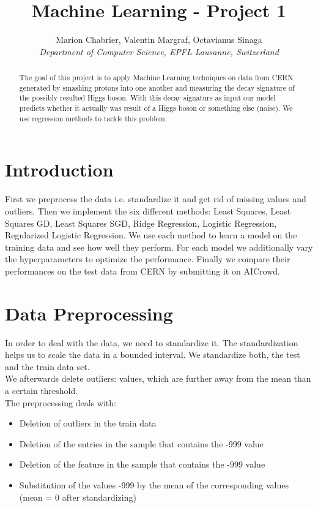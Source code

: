 \documentclass[10pt,conference,compsocconf]{IEEEtran}
\begin{document}
\title{Machine Learning - Project 1}

\author{
  Marion Chabrier, Valentin Margraf, Octavianus Sinaga\\
  \textit{Department of Computer Science, EPFL Lausanne, Switzerland}
}

\maketitle

\begin{abstract}
The goal of this project is to apply Machine Learning techniques on data from CERN generated by smashing protons into one another and measuring the decay signature of the possibly resulted Higgs boson. With this decay signature as input our model predicts whether it actually was result of a Higgs boson or something else (noise). We use regression methods to tackle this problem.
\end{abstract}

\section{Introduction}
First we preprocess the data i.e. standardize it and get rid of missing values and outliers.
Then we implement the six different methods: Least Squares, Least Squares GD, Least Squares SGD, Ridge Regression, Logistic Regression, Regularized Logistic Regression. We use each method to learn a model on the training data and see how well they perform. For each model we additionally vary the hyperparameters to optimize the performance. Finally we compare their performances on the test data from CERN by submitting it on AICrowd.



\section{Data Preprocessing}
\label{sec:prepro}
In order to deal with the data, we need to standardize it. The standardization helps us to scale the data in a bounded interval. We standardize both, the test and the train data set. \\
We afterwards delete outliers: values, which are further away from the mean than a certain threshold. 
\\
The preprocessing deals with:
\begin{itemize}
	\item Deletion of outliers in the train data
	\item Deletion of the entries in the sample that contains the -999 value
	\item Deletion of the feature in the sample that contains the -999 value
	\item Substitution of the values -999 by the mean of the corresponding values (mean = 0 after standardizing)
\end{itemize}
\end{document}
